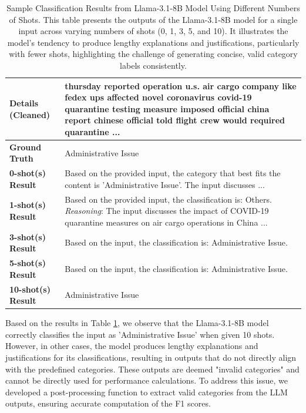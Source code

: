 \begin{table}[ht]
\caption{Sample Classification Results from Llama-3.1-8B Model Using Different Numbers of Shots. This table presents the outputs of the Llama-3.1-8B model for a single input across varying numbers of shots (0, 1, 3, 5, and 10). It illustrates the model's tendency to produce lengthy explanations and justifications, particularly with fewer shots, highlighting the challenge of generating concise, valid category labels consistently.}
\centering
\setlength{\tabcolsep}{6pt} %
\renewcommand{\arraystretch}{1.2} %
\begin{tabularx}{.49\textwidth}{|>{\raggedright\arraybackslash\hspace{0pt}}p{1.2cm}|>{\raggedright\arraybackslash\hspace{0pt}}X|}
\hline
\textbf{Details (Cleaned)} & thursday reported operation u.s. air cargo company like fedex ups affected novel coronavirus covid-19 quarantine testing measure imposed 
official china report chinese official told flight crew would required quarantine ... \\
\hline
\textbf{Ground Truth} & Administrative Issue \\
\hline
\textbf{0-shot(s) Result} & Based on the provided input, the category that best fits the content is 'Administrative Issue'. The input discusses ... \\
\hline
\textbf{1-shot(s) Result} & Based on the provided input, the classification is: Others. \textit{Reasoning}: The input discusses the impact of COVID-19 quarantine measures on air cargo operations in China ... \\
\hline
\textbf{3-shot(s) Result} & Based on the input, the classification is: Administrative Issue. \\
\hline
\textbf{5-shot(s) Result} & Based on the input, the classification is: Administrative Issue. \\
\hline
\textbf{10-shot(s) Result} & Administrative Issue \\
\hline
\end{tabularx}
\label{tab:classification_results}
\end{table}

Based on the results in Table \ref{tab:classification_results}, we observe that the Llama-3.1-8B model correctly classifies the input as 'Administrative Issue' when given 10 shots. However, in other cases, the model produces lengthy explanations and justifications for its classifications, resulting in outputs that do not directly align with the predefined categories. These outputs are deemed "invalid categories" and cannot be directly used for performance calculations. To address this issue, we developed a post-processing function to extract valid categories from the LLM outputs, ensuring accurate computation of the F1 scores.

